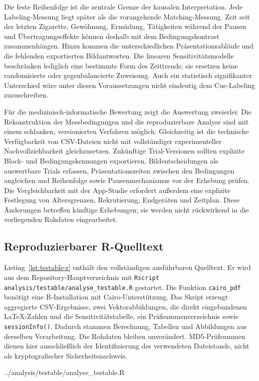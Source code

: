 Die feste Reihenfolge ist die zentrale Grenze der kausalen Interpretation. Jede Labeling-Messung liegt später als die vorangehende Matching-Messung. Zeit seit der letzten Zigarette, Gewöhnung, Ermüdung, Tätigkeiten während der Pausen und Übertragungseffekte können deshalb mit dem Bedingungskontrast zusammenhängen. Hinzu kommen die unterschiedlichen Präsentationsabläufe und die fehlenden exportierten Bildantworten. Die linearen Sensitivitätsmodelle beschränken lediglich eine bestimmte Form des Zeittrends; sie ersetzen keine randomisierte oder gegenbalancierte Zuweisung. Auch ein statistisch signifikanter Unterschied wäre unter diesen Voraussetzungen nicht eindeutig dem Cue-Labeling zuzuschreiben.

Für die medizinisch-informatische Bewertung zeigt die Auswertung zweierlei: Die Rekonstruktion der Messbedingungen und die reproduzierbare Analyse sind mit einem schlanken, versionierten Verfahren möglich. Gleichzeitig ist die technische Verfügbarkeit von CSV-Dateien nicht mit vollständiger experimenteller Nachvollziehbarkeit gleichzusetzen. Zukünftige Trial-Versionen sollten explizite Block- und Bedingungskennungen exportieren, Bildentscheidungen als auswertbare Trials erfassen, Präsentationszeiten zwischen den Bedingungen angleichen und Reihenfolge sowie Pausenmechanismus vor der Erhebung prüfen. Die Vergleichbarkeit mit der App-Studie erfordert außerdem eine explizite Festlegung von Altersgrenzen, Rekrutierung, Endgeräten und Zeitplan. Diese Änderungen betreffen künftige Erhebungen; sie werden nicht rückwirkend in die vorliegenden Rohdaten eingearbeitet.

\subsection{Reproduzierbarer R-Quelltext}
\label{sec:testable-r-code}
Listing~\ref{lst:testable-r} enthält den vollständigen ausführbaren Quelltext. Er wird aus dem Repository-Hauptverzeichnis mit \texttt{Rscript analysis/testable/analyse\_testable.R} gestartet. Die Funktion \texttt{cairo\_pdf} benötigt eine R-Installation mit Cairo-Unterstützung. Das Skript erzeugt aggregierte CSV-Ergebnisse, zwei Vektorabbildungen, die direkt eingebundenen LaTeX-Zahlen und die Sensitivitätstabelle, ein Prüfsummenverzeichnis sowie \texttt{sessionInfo()}. Dadurch stammen Berechnung, Tabellen und Abbildungen aus derselben Verarbeitung. Die Rohdaten bleiben unverändert. MD5-Prüfsummen dienen hier ausschließlich der Identifizierung des verwendeten Dateistands, nicht als kryptografischer Sicherheitsnachweis.


 {../analysis/testable/analyse_testable.R}

